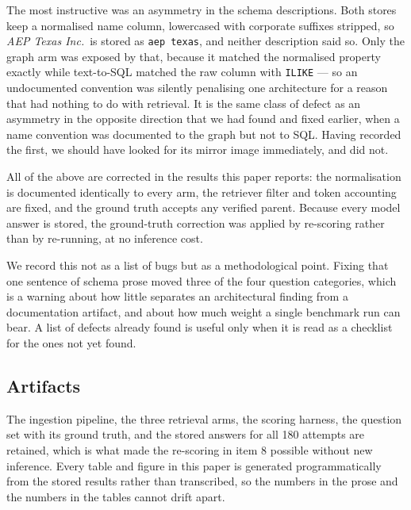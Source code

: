 The most instructive was an asymmetry in the schema descriptions. Both stores
keep a normalised name column, lowercased with corporate suffixes stripped, so
\emph{AEP Texas Inc.}\ is stored as \texttt{aep texas}, and neither description
said so. Only the graph arm was exposed by that, because it matched the
normalised property exactly while text-to-SQL matched the raw column with
\texttt{ILIKE} --- so an undocumented convention was silently penalising one
architecture for a reason that had nothing to do with retrieval. It is the same
class of defect as an asymmetry in the opposite direction that we had found and
fixed earlier, when a name convention was documented to the graph but not to
SQL. Having recorded the first, we should have looked for its mirror image
immediately, and did not.

All of the above are corrected in the results this paper reports: the
normalisation is documented identically to every arm, the retriever filter and
token accounting are fixed, and the ground truth accepts any verified parent.
Because every model answer is stored, the ground-truth correction was applied by
re-scoring rather than by re-running, at no inference cost.

We record this not as a list of bugs but as a methodological point. Fixing that
one sentence of schema prose moved three of the four question categories, which
is a warning about how little separates an architectural finding from a
documentation artifact, and about how much weight a single benchmark run can
bear. A list of defects already found is useful only when it is read as a
checklist for the ones not yet found.

\subsection{Artifacts}

The ingestion pipeline, the three retrieval arms, the scoring harness, the
question set with its ground truth, and the stored answers for all 180 attempts
are retained, which is what made the re-scoring in item 8 possible without new
inference. Every table and figure in this paper is generated programmatically from
the stored results rather than transcribed, so the numbers in the prose and the
numbers in the tables cannot drift apart.
